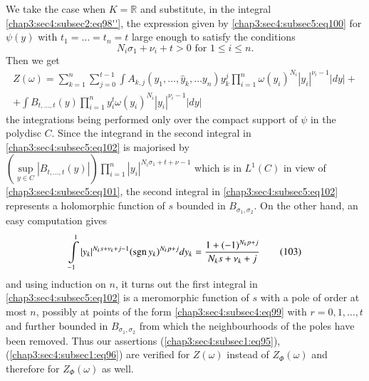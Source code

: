 We take the case when $K=\mathbb{R}$ and substitute, in the integral
\ref{chap3:sec4:subsec2:eq98''}, the expression given
by \ref{chap3:sec4:subsec5:eq100} for
$\psi(y)$ with 
$t_{1}=\ldots=t_{n}=t$ large enough to satisfy the conditions
\begin{equation*}
  N_{i}\sigma_{1}+\nu_{i}+t>0\text{ \  for \ } 1\leq i\leq
  n.\tag{101}\label{chap3:sec4:subsec5:eq101}
\end{equation*}
Then we get
\begin{multline*}
  Z(\omega) = \sum^{n}_{k=1}\sum^{t-1}_{j=0}\int
  A_{k,j}(y_{1},\ldots,\hat{y}_{k},\ldots
  y_{n})y^{j}_{k}\prod^{n}_{i=1}\omega(y_{i})^{N_{i}}|y_{i}|^{\nu_{i}-1}|dy|+\\
  +\int
  B_{t,\ldots,t}(y)\prod^{n}_{i=1}y^{t}_{i}\omega(y_{i})^{N_{i}}
  |y_{i}|^{\nu_{i}-1}|dy|\tag{102}\label{chap3:sec4:subsec5:eq102} 
\end{multline*}
the integrations being performed only over the compact support of
$\psi$ in the polydisc $C$. Since the integrand in the second integral
in \ref{chap3:sec4:subsec5:eq102} is majorised by $(\sup\limits_{y\in
  C}|B_{t,\ldots,t}(y)|)\prod\limits^{n}_{i=1}|y_{i}|^{N_{i}\sigma_{1}+t+\nu-1}$
which is in $L^{1}(C)$ in view of \ref{chap3:sec4:subsec5:eq101}, the
second integral in 
\ref{chap3:sec4:subsec5:eq102} represents a holomorphic function of $s$ bounded in
$B_{\sigma_{1},\sigma_{2}}$. On the other hand, an easy computation
gives
\begin{equation*}
  \int\limits^{1}_{-1}|y_{k}|^{N_{k}s+\nu_{k}+j-1} (\operatorname{sgn}
  y_{k})^{N_{k}p+j} dy_{k}=\frac{1+(-1)^{N_{k}p+j}}{N_{k}s+\nu_{k}+j}
  \tag{103}\label{chap3:sec4:subsec5:eq103} 
\end{equation*}
and using induction on $n$, it turns out the first integral in
\ref{chap3:sec4:subsec5:eq102} is a meromorphic function of $s$ with a
pole of order at 
most $n$, possibly at points of the form \ref{chap3:sec4:subsec4:eq99}
with\pageoriginale 
$r=0,1,\ldots,t$ and further bounded in $B_{\sigma_{1},\sigma_{2}}$
from which the neighbourhoods of the poles have been removed. Thus our
assertions (\ref{chap3:sec4:subsec1:eq95}), (\ref{chap3:sec4:subsec1:eq96}) are verified for $Z(\omega)$ instead
of $Z_{\Phi}(\omega)$ and therefore for $Z_{\Phi}(\omega)$ as well.

\subsection{}\label{chap3:sec4:subsec6}%


